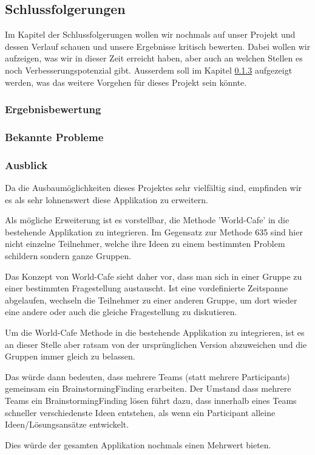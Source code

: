 \subsection{Schlussfolgerungen}
Im Kapitel der Schlussfolgerungen wollen wir nochmals auf unser Projekt und dessen Verlauf schauen und unsere Ergebnisse kritisch bewerten. Dabei wollen wir aufzeigen, was wir in dieser Zeit erreicht haben, aber auch an welchen Stellen es noch Verbesserungspotenzial gibt. Ausserdem soll im Kapitel \ref{subsub:Ausblick} aufgezeigt werden, was das weitere Vorgehen für dieses Projekt sein könnte.

\subsubsection{Ergebnisbewertung}

\subsubsection{Bekannte Probleme}

\subsubsection{Ausblick}
\label{subsub:Ausblick}
Da die Ausbaumöglichkeiten dieses Projektes sehr vielfältig sind, empfinden wir es als sehr lohnenswert diese Applikation zu erweitern.

Als mögliche Erweiterung ist es vorstellbar, die Methode 'World-Cafe' \cite{world-cafe} in die bestehende Applikation zu integrieren. Im Gegensatz zur Methode 635 sind hier nicht einzelne Teilnehmer, welche ihre Ideen zu einem bestimmten Problem schildern sondern ganze Gruppen.

Das Konzept von World-Cafe sieht daher vor, dass man sich in einer Gruppe zu einer bestimmten Fragestellung austauscht. Ist eine vordefinierte Zeitspanne abgelaufen, wechseln die Teilnehmer zu einer anderen Gruppe, um dort wieder eine andere oder auch die gleiche Fragestellung zu diskutieren. 

Um die World-Cafe Methode in die bestehende Applikation zu integrieren, ist es an dieser Stelle aber ratsam von der ursprünglichen Version abzuweichen und die Gruppen immer gleich zu belassen. 

Das würde dann bedeuten, dass mehrere Teams (statt mehrere Participants) gemeinsam ein BrainstormingFinding erarbeiten. Der Umstand dass mehrere Teams ein BrainstormingFinding lösen führt dazu, dass innerhalb eines Teams schneller verschiedenste Ideen entstehen, als wenn ein Participant alleine Ideen/Lösungsansätze entwickelt. 

Dies würde der gesamten Applikation nochmals einen Mehrwert bieten. 